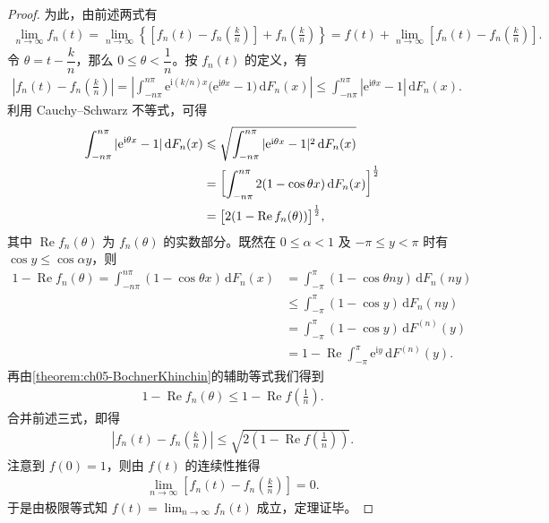 \documentclass[../../main.tex]{subfiles}
\begin{document}
\begin{proof}
为此，由前述两式有
\begin{align}
\lim_{n\to\infty}f_n(t)=\lim_{n\to\infty}\left\{\left[f_n(t)-f_n\!\left(\frac{k}{n}\right)\right]+f_n\!\left(\frac{k}{n}\right)\right\}
=f(t)+\lim_{n\to\infty}\left[f_n(t)-f_n\!\left(\frac{k}{n}\right)\right].
\end{align}
令 $\theta=t-\dfrac{k}{n}$，那么 $0\leqslant\theta<\dfrac1n$。按 $f_n(t)$ 的定义，有
\begin{align}
\left|f_n(t)-f_n\!\left(\frac{k}{n}\right)\right|
=\left|\int_{-n\pi}^{n\pi}\mathrm{e}^{\mathrm{i}(k/n)x}\bigl(\mathrm{e}^{\mathrm{i}\theta x}-1\bigr)\,\mathrm{d}F_n(x)\right|
\leqslant\int_{-n\pi}^{n\pi}|\mathrm{e}^{\mathrm{i}\theta x}-1|\,\mathrm{d}F_n(x).
\end{align}
利用 Cauchy--Schwarz 不等式，可得
\begin{align}
\int_{-n\pi}^{n\pi}|\mathrm{e}^{\mathrm{i}\theta x}-1|\,\mathrm{d}F_n(x)
&\leqslant\sqrt{\int_{-n\pi}^{n\pi}|\mathrm{e}^{\mathrm{i}\theta x}-1|^{2}\,\mathrm{d}F_n(x)}\notag\\
&=\left[\int_{-n\pi}^{n\pi}2(1-\cos\theta x)\,\mathrm{d}F_n(x)\right]^{\frac12}\notag\\
&=\bigl[2(1-\operatorname{Re}f_n(\theta))\bigr]^{\frac12},
\end{align}
其中 $\operatorname{Re}f_n(\theta)$ 为 $f_n(\theta)$ 的实数部分。既然在 $0\leqslant\alpha<1$ 及 $-\pi\leqslant y<\pi$ 时有 $\cos y\leqslant\cos\alpha y$，则
\begin{align*}
1-\operatorname{Re}f_n(\theta)=\int_{-n\pi}^{n\pi}(1-\cos\theta x)\,\mathrm{d}F_n(x)
&=\int_{-\pi}^{\pi}(1-\cos\theta ny)\,\mathrm{d}F_n(ny)\\
&\leqslant\int_{-\pi}^{\pi}(1-\cos y)\,\mathrm{d}F_n(ny)\\
&=\int_{-\pi}^{\pi}(1-\cos y)\,\mathrm{d}F^{(n)}(y)\\
&=1-\operatorname{Re}\int_{-\pi}^{\pi}\mathrm{e}^{\mathrm{i}y}\,\mathrm{d}F^{(n)}(y).
\end{align*}
再由\cref{theorem:ch05-BochnerKhinchin}的辅助等式我们得到
\begin{align}
1-\operatorname{Re}f_n(\theta)\leqslant 1-\operatorname{Re}f\!\left(\frac1n\right).
\end{align}
合并前述三式，即得
\begin{align*}
\left|f_n(t)-f_n\!\left(\frac{k}{n}\right)\right|\leqslant\sqrt{2\left(1-\operatorname{Re}f\!\left(\frac1n\right)\right)}.
\end{align*}
注意到 $f(0)=1$，则由 $f(t)$ 的连续性推得
\begin{align*}
\lim_{n\to\infty}\left[f_n(t)-f_n\!\left(\frac{k}{n}\right)\right]=0.
\end{align*}
于是由极限等式知 $f(t)=\lim_{n\to\infty}f_n(t)$ 成立，定理证毕。
\end{proof}
\end{document}
